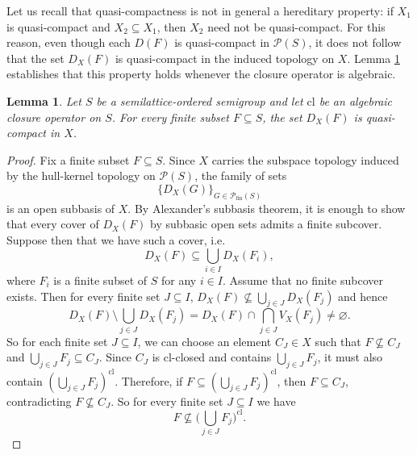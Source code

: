 \documentclass[10pt, reqno]{amsart}
\theoremstyle{plain}
\newtheorem{lemma}[theorem]{Lemma}
\theoremstyle{definition}
\begin{document}
Let us recall that quasi-compactness is not in general a hereditary property: if $X_1$ is quasi-compact and $X_2 \subseteq X_1$, then $X_2$ need not be quasi-compact. For this reason, even though each $D(F)$ is quasi-compact in $\mathcal{P}(S)$, it does not follow that the set $D_X(F)$ is quasi-compact in the induced topology on $X$. Lemma \ref{quasi_compactness_of_subbasic_opens} establishes that this property holds whenever the closure operator is algebraic.  
\begin{lemma}\label{quasi_compactness_of_subbasic_opens}
    Let $S$ be a semilattice-ordered semigroup and let $\mathrm{cl}$ be an algebraic closure operator on $S$. For every finite subset $F \subseteq S$, the set $D_X(F)$ is quasi-compact in $X$. 
\end{lemma}
\begin{proof}
    Fix a finite subset $F \subseteq S$. Since $X$ carries the subspace topology induced by the hull-kernel topology on $\mathcal{P}(S)$, the family of sets $$\{D_X(G)\}_{G\in\mathcal{P}_\mathrm{fin}(S)}$$ is an open subbasis of $X$. By Alexander's subbasis theorem, it is enough to show that every cover of $D_X(F)$ by subbasic open sets admits a finite subcover. Suppose then that we have such a cover, i.e.
    \begin{equation}\label{cover_by_subbasic_opens}
        D_X(F) \subseteq \bigcup_{i\in I} D_X(F_i),  
    \end{equation}
    where $F_i$ is a finite subset of $S$ for any $i\in I$. 
    Assume that no finite subcover exists. Then for every finite set $J \subseteq I$, $D_X(F) \nsubseteq \bigcup_{j \in J}D_X(F_j)$ and hence 
    \begin{equation*}
        D_X(F) \setminus\bigcup_{j \in J} D_X(F_j) = D_X(F) \cap \bigcap_{j \in J} V_X(F_j) \neq \varnothing. 
    \end{equation*}
    So for each finite set $J \subseteq I$, we can choose an element $C_J \in X$ such that $F \nsubseteq C_J$ and $\bigcup_{j \in J} F_j \subseteq C_J$. Since $C_J$ is $\mathrm{cl}$-closed and contains $\bigcup_{j\in J}F_j$, it must also contain $(\bigcup_{j \in J} F_j)^{\mathrm{cl}}$. Therefore, if $F \subseteq (\bigcup_{j \in J} F_j)^{\mathrm{cl}}$, then $F\subseteq C_J$, contradicting $F \nsubseteq C_J$. So for every finite set $J \subseteq I$ we have 
    \begin{equation}\label{F_is_not_contained_in_cl_of_finite_sum} 
    F \nsubseteq \Big(\bigcup_{j \in J} F_j\Big)^{\mathrm{cl}}.
    \end{equation}
    

\end{proof}
\end{document}
